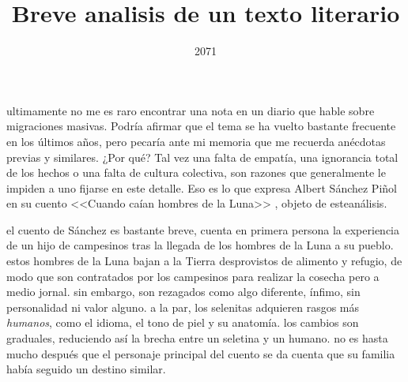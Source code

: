 \documentclass[a3paper]{tufte-handout}
\title{Breve analisis de un texto literario}
\date{2071}
\begin{document}
\maketitle



ultimamente no me es raro encontrar una nota en un diario que hable sobre migraciones masivas. Podría afirmar que el tema se ha vuelto bastante frecuente en los últimos años, pero pecaría ante mi memoria que me recuerda anécdotas previas y similares. ¿Por qué? Tal vez una falta de empatía, una ignorancia total de los hechos o una falta de cultura colectiva, son razones que generalmente le impiden a uno fijarse en este detalle. Eso es lo que expresa Albert Sánchez Piñol en su cuento <<Cuando caían hombres de la Luna>> \citep{Albert}, objeto de esteanálisis. 

el cuento de Sánchez es bastante breve, cuenta en primera persona la experiencia de un hijo de campesinos tras la llegada de los hombres de la Luna a su pueblo. estos hombres de la Luna bajan a la Tierra desprovistos de alimento y refugio, de modo que son contratados por los campesinos para realizar la cosecha pero a medio jornal. sin embargo, son rezagados como algo diferente, ínfimo, sin personalidad ni valor alguno. a la par, los selenitas adquieren rasgos más \emph{humanos}, como el idioma, el tono de piel y su anatomía. los cambios son graduales, reduciendo así la brecha entre un seletina y un humano. no es hasta mucho después que el personaje principal del cuento se da cuenta que su familia había seguido un destino similar.
\end{document}
